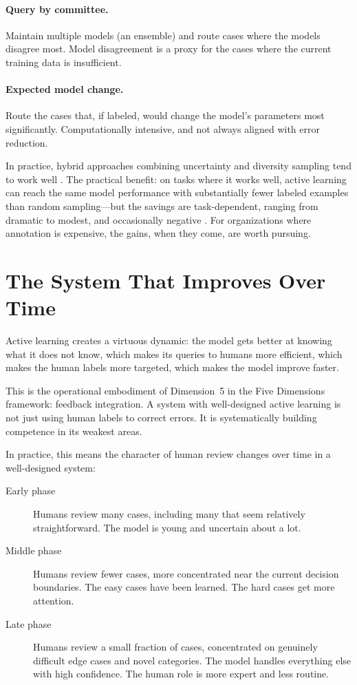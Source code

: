 \paragraph{Query by committee.} Maintain multiple models (an ensemble) and route cases where the models disagree most. Model disagreement is a proxy for the cases where the current training data is insufficient.

\paragraph{Expected model change.} Route the cases that, if labeled, would change the model's parameters most significantly. Computationally intensive, and not always aligned with error reduction.

In practice, hybrid approaches combining uncertainty and diversity sampling tend to work well \autocite{settles2009active}. The practical benefit: on tasks where it works well, active learning can reach the same model performance with substantially fewer labeled examples than random sampling---but the savings are task-dependent, ranging from dramatic to modest, and occasionally negative \autocite{settles2009active}. For organizations where annotation is expensive, the gains, when they come, are worth pursuing.

\section{The System That Improves Over Time}
\label{sec:ch17-improvement-over-time}

Active learning creates a virtuous dynamic: the model gets better at knowing what it does not know, which makes its queries to humans more efficient, which makes the human labels more targeted, which makes the model improve faster.

This is the operational embodiment of Dimension~5 in the Five Dimensions framework: feedback integration. A system with well-designed active learning is not just using human labels to correct errors. It is systematically building competence in its weakest areas.

In practice, this means the character of human review changes over time in a well-designed \hitl system:

\begin{description}
  \item[Early phase] Humans review many cases, including many that seem relatively straightforward. The model is young and uncertain about a lot.
  \item[Middle phase] Humans review fewer cases, more concentrated near the current decision boundaries. The easy cases have been learned. The hard cases get more attention.
  \item[Late phase] Humans review a small fraction of cases, concentrated on genuinely difficult edge cases and novel categories. The model handles everything else with high confidence. The human role is more expert and less routine.
\end{description}

